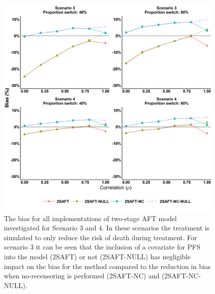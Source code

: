 \begin{figure}[ht]
\centering
\includegraphics[width=12cm]{images/chap_sim3/2saft_bias.png}
\caption{\label{F:chap_sim3:2saft_bias34} The bias for all implementations of two-stage AFT model investigated for Scenario 3 and 4. In these scenarios the treatment is simulated to only reduce the risk of death during treatment. For scenario 3 it can be seen that the inclusion of a covariate for PFS into the model (2SAFT) or not (2SAFT-NULL) has negligible impact on the bias for the method compared to the reduction in bias when no-recensoring is performed (2SAFT-NC) and (2SAFT-NC-NULL).} 
\end{figure}


